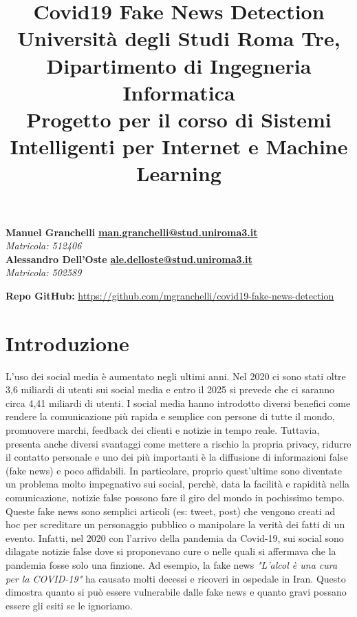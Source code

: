 \documentclass{article}
\title{\textbf{Covid19 Fake News Detection} \\[1ex] \large Università degli Studi Roma Tre, Dipartimento di Ingegneria Informatica \\[1ex] \normalsize Progetto per il corso di Sistemi Intelligenti per Internet e Machine Learning}
\date{}
\begin{document}
\maketitle
\begin{flushleft}
\textbf{Manuel Granchelli} 
\hfill {\href{mailto:man.granchelli@stud.uniroma3.it}{\textbf{man.granchelli@stud.uniroma3.it}}} \\
\textit{Matricola: 512406}\\
\textbf{Alessandro Dell'Oste} 
\hfill {\href{mailto:ale.delloste@stud.uniroma3.it}{\textbf{ale.delloste@stud.uniroma3.it}}} \\
\textit{Matricola: 502589}\\


\par\bigskip
\textbf{Repo GitHub:} \href{https://github.com/mgranchelli/covid19-fake-news-detection} {https://github.com/mgranchelli/covid19-fake-news-detection}
\end{flushleft}

\section*{Introduzione}
L'uso dei social media è aumentato negli ultimi anni. Nel 2020 ci sono stati oltre 3,6 miliardi di utenti sui social media e entro il 2025 si prevede che ci saranno circa 4,41 miliardi di utenti. I social media hanno introdotto diversi benefici come rendere la comunicazione più rapida e semplice con persone di tutte il mondo, promuovere marchi, feedback dei clienti e notizie in tempo reale.
Tuttavia, presenta anche diversi svantaggi come mettere a rischio la propria privacy, ridurre il contatto personale e uno dei più importanti è la diffusione di informazioni false (fake news) e poco affidabili. 
In particolare, proprio quest'ultime sono diventate un problema molto impegnativo sui social, perchè, data la facilità e rapidità nella comunicazione, notizie false possono fare il giro del mondo in pochissimo tempo. Queste fake news sono semplici articoli (es: tweet, post) che vengono creati ad hoc per screditare un personaggio pubblico o manipolare la verità dei fatti di un evento. Infatti, nel 2020 con l'arrivo della pandemia da Covid-19, sui social sono dilagate notizie false dove si proponevano cure o nelle quali si affermava che la pandemia fosse solo una finzione. Ad esempio, la fake news \textit{"L'alcol è una cura per la COVID-19"} ha causato molti decessi e ricoveri in ospedale in Iran. Questo dimostra quanto si può essere vulnerabile dalle fake news e quanto gravi possano essere gli esiti se le ignoriamo.
\end{document}
